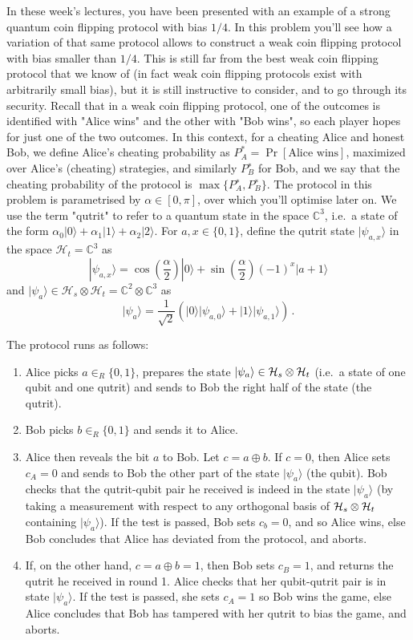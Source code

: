 \documentclass[a4paper,10pt,landscape,twocolumn]{scrartcl}
\newcommand{\ket}[1]{| #1 \rangle}
\begin{document}
\begin{exercise}
In these week's lectures, you have been presented with an example of a strong quantum coin flipping protocol with bias $1/4$. In this problem you'll see how a variation of that same protocol allows to construct a weak coin flipping protocol with bias smaller than $1/4$. This is still far from the best weak coin flipping protocol that we know of (in fact weak coin flipping protocols exist with arbitrarily small bias), but it is still instructive to consider, and to go through its security. 
Recall that in a weak coin flipping protocol, one of the outcomes is identified with "Alice wins" and the other with "Bob wins", so each player hopes for just one of the two outcomes. In this context, for a cheating Alice and honest Bob, we define Alice's cheating probability as $P^*_A=\Pr[\text{Alice wins}]$, maximized over Alice's (cheating) strategies, and similarly $P_B^∗$ for Bob, and we say that the cheating probability of the protocol is $\max\{P_A^∗,P_B^∗\}$. The protocol in this problem is parametrised by $\alpha \in [0,\pi]$, over which you'll optimise later on. 
We use the term "qutrit" to refer to a quantum state in the space $\mathbb{C}^3$, i.e.\ a state of the form $\alpha_0\ket{0}+\alpha_1\ket{1} + \alpha_2 \ket{2}$. For $a,x \in \{0,1\}$, define the qutrit state $\ket{\psi_{a,x}}$ in the space $\mathcal{H}_t = \mathbb{C}^3$ as
\[
\ket{\psi_{a,x}} = \cos(\frac{\alpha}{2}) \ket{0} + \sin(\frac{\alpha}{2}) (-1)^x \ket{a+1}
\]
and $\ket{\psi_a} \in \mathcal{H}_s \otimes \mathcal{H}_t = \mathbb{C}^2 \otimes \mathbb{C}^3$ as 
\[
\ket{\psi_a} = \frac{1}{\sqrt{2}} ( \ket{0} \ket{\psi_{a,0}} + \ket{1} \ket{\psi_{a,1}} ) \, .
\]

The protocol runs as follows:
\begin{enumerate}
\item Alice picks $a \in_R \{0,1\}$, prepares the state $\ket{\psi_a} \in \mathcal{H}_s \otimes \Hi_t$ (i.e.\ a state of one qubit and one qutrit) and sends to Bob the right half of the state (the qutrit).
\item Bob picks $b \in_R \{0,1\}$ and sends it to Alice.
\item Alice then reveals the bit $a$ to Bob. Let $c=a \oplus b$. If $c=0$, then Alice sets $c_A=0$ and sends to Bob the other part of the state $\ket{\psi_a}$ (the qubit). Bob checks that the qutrit-qubit pair he received is indeed in the state $\ket{\psi_a}$ (by taking a measurement with respect to any orthogonal basis of $\mathcal{H}_s \otimes \mathcal{H}_t$ containing $\ket{\psi_a}$). If the test is passed, Bob sets $c_b=0$, and so Alice wins, else Bob concludes that Alice has deviated from the protocol, and aborts.
\item If, on the other hand, $c=a \oplus b=1$, then Bob sets $c_B=1$, and returns the qutrit he received in round 1. Alice checks that her qubit-qutrit pair is in state $\ket{\psi_a}$. If the test is passed, she sets $c_A=1$ so Bob wins the game, else Alice concludes that Bob has tampered with her qutrit to bias the game, and aborts.
\end{enumerate}


\end{exercise}
\end{document}
